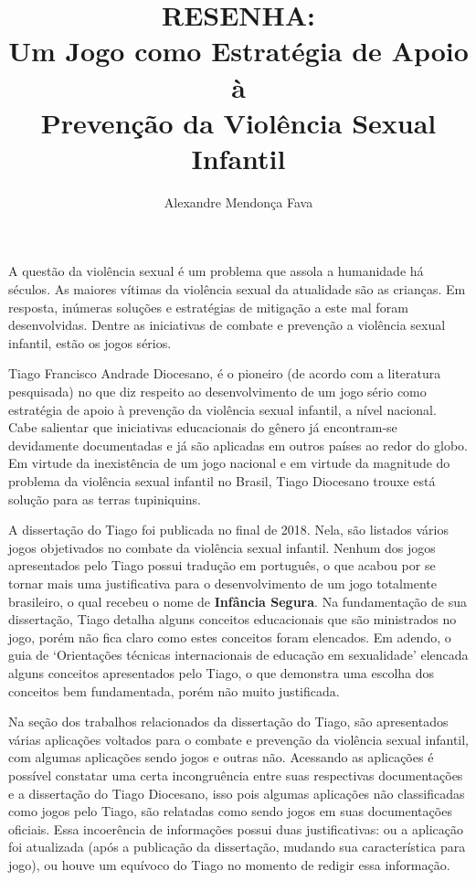\documentclass[12pt]{article}
\title{RESENHA: \\ Um Jogo como Estratégia de Apoio à \\ Prevenção da Violência Sexual Infantil}
\author{Alexandre Mendonça Fava\inst{1}}
\begin{document}
 

\maketitle

A questão da violência sexual é um problema que assola a humanidade há séculos. As maiores vítimas da violência sexual da atualidade são as crianças. Em resposta, inúmeras soluções e estratégias de mitigação a este mal foram desenvolvidas. Dentre as iniciativas de combate e prevenção a violência sexual infantil, estão os jogos sérios. 

Tiago Francisco Andrade Diocesano, é o pioneiro (de acordo com a literatura pesquisada) no que diz respeito ao desenvolvimento de um jogo sério como estratégia de apoio à prevenção da violência sexual infantil, a nível nacional. Cabe salientar que iniciativas educacionais do gênero já encontram-se devidamente documentadas e já são aplicadas em outros países ao redor do globo. Em virtude da inexistência de um jogo nacional e em virtude da magnitude do problema da violência sexual infantil no Brasil, Tiago Diocesano trouxe está solução para as terras tupiniquins.

A dissertação do Tiago foi publicada no final de 2018. Nela, são listados vários jogos objetivados no combate da violência sexual infantil. Nenhum dos jogos apresentados pelo Tiago possui tradução em português, o que acabou por se tornar mais uma justificativa para o desenvolvimento de um jogo totalmente brasileiro, o qual recebeu o nome de \textbf{Infância Segura}. Na fundamentação de sua dissertação, Tiago detalha alguns conceitos educacionais que são ministrados no jogo, porém não fica claro como estes conceitos foram elencados. Em adendo, o guia de `Orientações técnicas internacionais de educação em sexualidade' elencada alguns conceitos apresentados pelo Tiago, o que demonstra uma escolha dos conceitos bem fundamentada, porém não muito justificada.

Na seção dos trabalhos relacionados da dissertação do Tiago, são apresentados várias aplicações voltados para o combate e prevenção da violência sexual infantil, com algumas aplicações sendo jogos e outras não. Acessando as aplicações é possível constatar uma certa incongruência entre suas respectivas documentações e a dissertação do Tiago Diocesano, isso pois algumas aplicações não classificadas como jogos pelo Tiago, são relatadas como sendo jogos em suas documentações oficiais. Essa incoerência de informações possui duas justificativas: ou a aplicação foi atualizada (após a publicação da dissertação, mudando sua característica para jogo), ou houve um equívoco do Tiago no momento de redigir essa informação.
\end{document}
